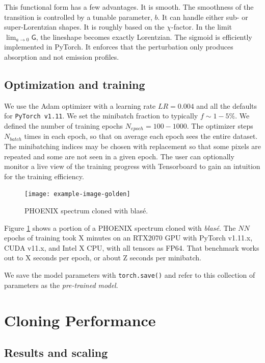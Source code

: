 \documentclass[modern]{aastex631}
\begin{document}
This functional form has a few advantages. It is smooth.  The smoothness of the transition is controlled by a tunable parameter, $b$.  It can handle either sub- or super-Lorentzian shapes.  It is roughly based on the $\chi$-factor.  In the limit $\lim_{a\to0} \mathsf{G}$, the lineshape becomes exactly Lorentzian.  The sigmoid is efficiently implemented in PyTorch.
It enforces that the perturbation only produces absorption and not emission profiles.




\subsection{Optimization and training}

We use the Adam optimizer with a learning rate $LR=0.004$ and all the defaults for \texttt{PyTorch v1.11}.  We set the minibatch fraction to typically $f\sim1-5\%$.  We defined the number of training epochs $N_{epoch}=100-1000$.  The optimizer steps $N_{batch}$ times in each epoch, so that on average each epoch sees the entire dataset.  The minibatching indices may be chosen with replacement so that some pixels are repeated and some are not seen in a given epoch.  The user can optionally monitor a live view of the training progress with Tensorboard to gain an intuition for the training efficiency.


\begin{figure}[hbt!]
  \centering
  \texttt{[image: example-image-golden]}
  \caption{PHOENIX spectrum cloned with blas\'e.}
  \label{fig_cloned_spectrum_demo}
\end{figure}

Figure \ref{fig_cloned_spectrum_demo} shows a portion of a PHOENIX spectrum cloned with \emph{blas\'e}.  The $NN$ epochs of training took X minutes on an RTX2070 GPU with PyTorch v1.11.x, CUDA v11.x, and Intel X CPU, with all tensors as FP64.  That benchmark works out to X seconds per epoch, or about Z seconds per minibatch.

We save the model parameters with \texttt{torch.save()} and refer to this collection of parameters as the \emph{pre-trained model}.

\section{Cloning Performance}

\subsection{Results and scaling}
\end{document}
